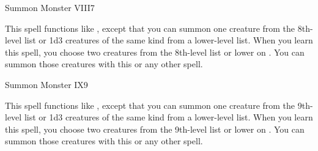 \begin{spellsection}{Summon Monster VIII}{7}
    \begin{spellheader}
    \end{spellheader}
    \begin{spellcontent}
        \begin{spelltargetinginfo}
        \end{spelltargetinginfo}
        \begin{spelleffects}
            \spellspecial This spell functions like , except that you can summon one creature from the 8th-level list or 1d3 creatures of the same kind from a lower-level list. When you learn this spell, you choose two creatures from the 8th-level list or lower on . You can summon those creatures with this or any other  spell.
            \spelldur \durshort \dismissable
        \end{spelleffects}
    \end{spellcontent}
    \begin{spellfooter}
        \miscastexplode
    \end{spellfooter}
\end{spellsection}

\begin{spellsection}{Summon Monster IX}{9}
    \begin{spellheader}
    \end{spellheader}
    \begin{spellcontent}
        \begin{spelltargetinginfo}
        \end{spelltargetinginfo}
        \begin{spelleffects}
            \spellspecial This spell functions like , except that you can summon one creature from the 9th-level list or 1d3 creatures of the same kind from a lower-level list. When you learn this spell, you choose two creatures from the 9th-level list or lower on . You can summon those creatures with this or any other  spell.

            \spelldur \durshort \dismissable
        \end{spelleffects}
    \end{spellcontent}
    \begin{spellfooter}
        \miscastexplode
    \end{spellfooter}
\end{spellsection}

